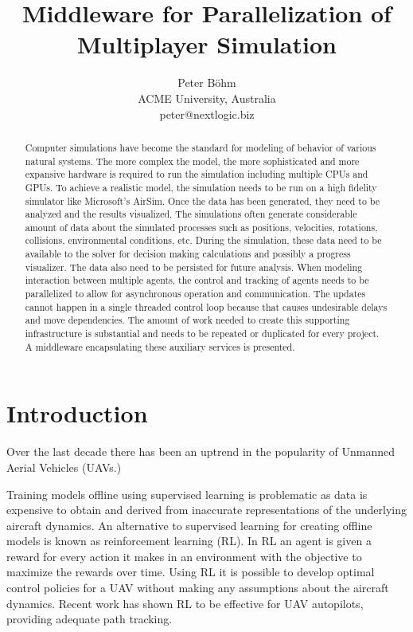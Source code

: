 \documentclass{article}
\title{Middleware for Parallelization of Multiplayer Simulation}
\author{Peter Böhm\\ 
	ACME University, Australia\\ 
peter@nextlogic.biz}
\begin{document}
\maketitle

\begin{abstract}
Computer simulations have become the standard for modeling of behavior of various natural systems. The more complex the model, the more sophisticated and more expansive hardware is required to run the simulation including multiple CPUs and GPUs. To achieve a realistic model, the simulation needs to be run on a high fidelity simulator like Microsoft's AirSim. Once the data has been generated, they need to be analyzed and the results visualized. The simulations often generate considerable amount of data about the simulated processes such as positions, velocities, rotations, collisions, environmental conditions, etc. During the simulation, these data need to be available to the solver for decision making calculations and possibly a progress visualizer. The data also need to be persisted for future analysis. When modeling interaction between multiple agents, the control and tracking of agents needs to be parallelized to allow for asynchronous operation and communication. The updates cannot happen in a single threaded control loop because that causes undesirable delays and move dependencies. The amount of work needed to create this supporting infrastructure is substantial and needs to be repeated or duplicated for every project. A middleware encapsulating these auxiliary services is presented.
\end{abstract}

\section{Introduction}

Over the last decade there has been an uptrend in the popularity of Unmanned Aerial Vehicles (UAVs.)

Training models offline using supervised learning is problematic as data is expensive to obtain and derived from inaccurate representations of the underlying aircraft dynamics. An alternative to supervised learning for creating offline models is known as reinforcement learning (RL). In RL an agent is given a reward for every action it makes in an environment with the objective to maximize the rewards over time. Using RL it is possible to develop optimal control policies for a UAV without making any assumptions about the aircraft dynamics. Recent work has shown RL to be effective for UAV autopilots, providing adequate path tracking. \cite{rlForUAVs}
\end{document}
